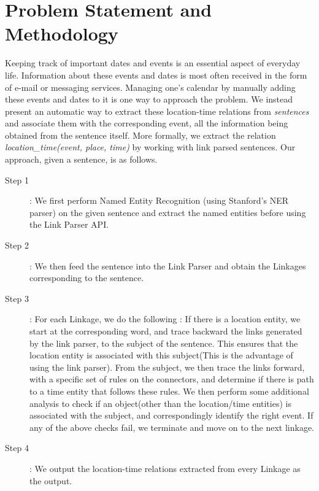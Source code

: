 \documentclass[runningheads,a4paper,11pt]{llncs}
\begin{document}
 \section{Problem Statement and Methodology}
 Keeping track of important dates and events is an essential aspect of everyday life. Information about these events and dates is most often received in the form of e-mail 
 or messaging services. Managing one's calendar by manually adding these events and dates to it is one way to approach the problem.
 We instead present an automatic way to extract these location-time relations from \textit{sentences} and associate them with the corresponding event, all 
 the information
 being obtained from the sentence itself. More formally, we extract the relation \textit{location\_time(event, place, time)} by working with link parsed sentences.
 Our approach, given a sentence, is as follows.
 \begin{description}
  \item[Step 1] : We first perform Named Entity Recognition (using Stanford's NER parser) on the given sentence and extract the named entities before using the Link Parser API.
 

 \item[Step 2] : We then feed the sentence into the Link Parser and obtain the Linkages corresponding to the sentence.  
\item[Step 3] : For each Linkage, we do the following : If there is a location entity, we start at the corresponding word, and trace backward the links generated by 
 the link parser, to the subject of the sentence. This ensures that the location entity is associated with this subject(This is the advantage of using the link parser). From the subject, 
 we then trace the links forward, with a specific set of rules on the connectors, and determine if there is path to a time entity that follows these rules. 
 We then perform some additional analysis to check if an object(other than the location/time entities) is associated with the subject, and correspondingly 
 identify the right event. If any of the above checks fail, we terminate and move on to the next linkage.
  \item[Step 4] : We output the location-time relations extracted from every Linkage as the output.
  \end{description}
  
\end{document}
